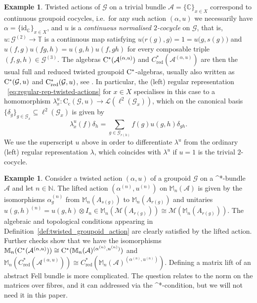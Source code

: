 \documentclass[11 pt, leqno]{amsart}
\numberwithin{equation}{section}
\theoremstyle{plain}
\theoremstyle{definition}
\newtheorem{ex}[thm]{Example}
\newcommand{\Mat}{\mathbb M} %
\newcommand*{\contc}{\mathrm{C_c}}%
\DeclareMathOperator{\red}{red}%
\newcommand{\LL}{\mathcal L}
\newcommand{\M}{\mathcal M}
\newcommand{\G}{\mathcal G} %
\newcommand{\A}{\mathcal A}
\newcommand{\C}{\mathbb C}
\newcommand{\N}{\mathbb N}
\newcommand{\cst}{\ifmmode\mathrm{C}^*\else{$\mathrm{C}^*$}\fi}
\begin{document}
\begin{ex}\label{ex:continuous-cocycles} 
Twisted actions of $\G$ on a trivial bundle $\A=\{\C\}_{x\in X}$ correspond to continuous groupoid cocycles, i.e.\ for any such action $(\alpha, u)$ we necessarily have $\alpha=\{ \mathrm{id}_{\C}\}_{x\in X}$, and $u$ is a \emph{continuous  normalised $2$-cocycle} on $\G$, that is, $u : \G^{(2)} \to \mathbb{T}$ is a continuous map satisfying $u\big( r(g),g \big) = 1 = u\big( g , s(g) \big)$  and $u(f,g)u(fg,h) = u(g,h)u(f,gh)$ for every composable triple $(f,g,h) \in \G^{(3)}$. 
The algebras $\cst(\A^{(\alpha,u)})$ and $C_{\red}^*(\A^{(\alpha,u)})$ are then the usual full and reduced twisted groupoid $\cst$-algebras, usually also written as $\cst(\G,u)$ and $\cst_{\red}(\G,u)$, see \cite{Renault0}.	 
In particular, the (left) regular representation ~\eqref{eq:regular-rep-twisted-actions} for $x\in X$ specialises in this case to a homomorphism $\lambda^u_x\colon \contc(\G,u)\to \LL(\ell^2(\G_x))$, which  on the canonical basis $\{\delta_g\}_{g\in \G_x}\subseteq \ell^2(\G_x)$ is given by
\begin{equation}\label{eq:regular-rep-twisted-groupoid}
    \lambda^u_x(f)\delta_h=\sum_{g\in \G_{r(h)}}f(g)u(g,h)\delta_{gh}.
\end{equation}
We use the superscript $u$ above in order to differentiate $\lambda^u$ from the ordinary (left) regular representation $\lambda$, which coincides with $\lambda^u$ if $u=1$ is the trivial $2$-cocycle. 
\end{ex}

\begin{ex}\label{ex:matrixtwistedactions}
Consider a twisted action $(\alpha, u)$ of a groupoid $\G$ on a \cst-bundle $\A$ and let $n \in \N$. 
The lifted action $(\alpha^{(n)}, u^{(n)})$ on $\Mat_n(\A)$ is given by the isomorphisms $\alpha_g^{(n)}$ from $\Mat_n(A_{s(g)})$ to $\Mat_n(A_{r(g)})$ and unitaries $u(g,h)^{(n)} = u(g,h) \otimes I_n \in  \Mat_n (\M(A_{r(g)})) \cong \M(\Mat_n(A_{r(g)}))$. 
The algebraic and topological conditions appearing in Definition~\ref{def:twisted_groupoid_action} are clearly satisfied by the lifted action. 
Further checks show that we have the isomorphisms $\Mat_n(\cst(\A^{(\alpha,u)})) \cong  \cst(\Mat_n(\A)^{(\alpha^{(n)},u^{(n)})})$ and $\Mat_n(C_{\red}^*(\A^{(\alpha,u)})) \cong C_{\red}^*(\Mat_n(\A)^{(\alpha^{(n)},u^{(n)})})$.
Defining a matrix lift of an abstract Fell bundle is more complicated. 
The question relates to the norm on the matrices over fibres, and it can addressed via the \cst-condition, but we will not need it in this paper.
\end{ex}
\end{document}
